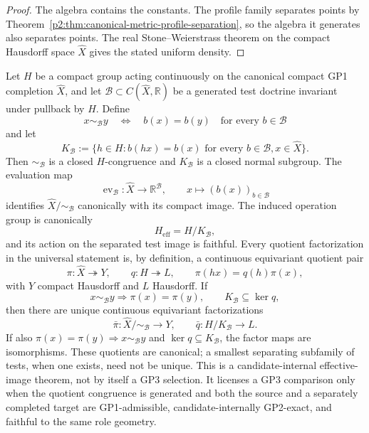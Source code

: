 \documentclass[11pt,a4paper]{article}
\begin{document}
\begin{proof}
The algebra contains the constants.  The profile family separates points by
Theorem~\ref{p2:thm:canonical-metric-profile-separation}, so the algebra it
generates also separates points.  The real Stone--Weierstrass theorem on the
compact Hausdorff space \(\widehat X\) gives the stated uniform density.
\end{proof}

\begin{theorem}
\label{p2:thm:universal-gp3-reduction}
Let \(H\) be a compact group acting continuously on the canonical compact GP1
completion \(\widehat X\), and let
\(\mathcal B\subset C(\widehat X,\mathbb R)\) be a generated test doctrine
invariant under pullback by \(H\).  Define
\[
 x\sim_{\mathcal B}y
 \quad\Longleftrightarrow\quad
 b(x)=b(y)\quad\text{for every }b\in\mathcal B
\]
and let
\[
 K_{\mathcal B}
 :=\{h\in H:b(hx)=b(x)\text{ for every }b\in\mathcal B,
                         x\in\widehat X\}.
\]
Then \(\sim_{\mathcal B}\) is a closed \(H\)-congruence and
\(K_{\mathcal B}\) is a closed normal subgroup.  The evaluation map
\[
 \operatorname{ev}_{\mathcal B}:\widehat X\longrightarrow\mathbb R^{\mathcal B},
 \qquad
 x\longmapsto(b(x))_{b\in\mathcal B}
\]
identifies \(\widehat X/{\sim_{\mathcal B}}\) canonically with its compact
image.
The induced operation group is canonically
\[
 H_{\mathrm{eff}}=H/K_{\mathcal B},
\]
and its action on the separated test image is faithful.  Every quotient
factorization in the universal statement is, by definition, a continuous
equivariant quotient pair
\[
 \pi:\widehat X\twoheadrightarrow Y,
 \qquad q:H\twoheadrightarrow L,
 \qquad \pi(hx)=q(h)\pi(x),
\]
with \(Y\) compact Hausdorff and \(L\) Hausdorff.  If
\[
 x\sim_{\mathcal B}y\Longrightarrow\pi(x)=\pi(y),
 \qquad K_{\mathcal B}\subseteq\ker q,
\]
then there are unique continuous equivariant factorizations
\[
 \bar\pi:\widehat X/{\sim_{\mathcal B}}\longrightarrow Y,
 \qquad
 \bar q:H/K_{\mathcal B}\longrightarrow L.
\]
If also \(\pi(x)=\pi(y)\Rightarrow x\sim_{\mathcal B}y\) and
\(\ker q\subseteq K_{\mathcal B}\), the factor maps are isomorphisms.  These
quotients are canonical; a smallest separating
subfamily of tests, when one exists, need not be unique.  This is a
candidate-internal effective-image theorem, not by itself a GP3 selection.  It
licenses a GP3 comparison only when the quotient congruence is generated and
both the source and a separately completed target are GP1-admissible,
candidate-internally GP2-exact, and faithful to the same role geometry.
\end{theorem}
\end{document}
